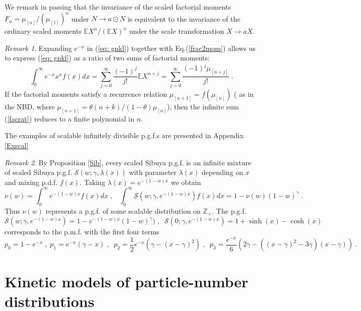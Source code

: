 \documentclass[a4paper,12pt]{amsart}
\newcommand{\E}{\mathbb{E}}
\newcommand{\Z}{\mathbb{Z}_{+}}
\theoremstyle{definition}
\theoremstyle{remark}
\newtheorem{Remark}{Remark}[section]
\begin{document}
We remark in passing that the invariance of the scaled factorial moments $F_n=\mu_{[n]}/(\mu_{[1]})^n$ under $N\to a\odot N$ is equivalent to the invariance of the ordinary scaled moments $\E X^n/(\E X)^n$ under the scale transformation $X\to aX$.        


\begin{Remark}
Expanding $e^{-x}$ in (\ref{eq: gnkl}) together with Eq.(\ref{frac2mom}) allows us to express  (\ref{eq: gnkl}) as a ratio of two sums of factorial moments:
\begin{equation}\label{facrat}
\int_{0}^{\infty}e^{-x}x^{n} f(x) dx=\sum_{j=0}^{\infty}\frac{(-1)^j}{j!}\E X^{n+j}=
\sum_{j=0}^{\infty}\frac{(-1)^j\mu_{[n+j]}}{j!}   
\;.
\end{equation}
If the factorial moments satisfy a recurrence relation $\mu_{[n+1]}=f(\mu_{[n]})$ ( as in the NBD, where $\mu_{[n+1]}=\theta(n+k)/(1-\theta)\mu_{[n]}$), then the infinite sum (\ref{facrat}) reduces to a finite polynomial in $n$. 
\end{Remark}

The examples of scalable infinitely divisible p.g.f.{}s are presented in Appendix \ref{Exscal}

\begin{Remark}

By Proposition \ref{Sib}, every scaled Sibuya p.g.f. is an infinite mixture of scaled Sibuya p.g.f. $\mathcal{S}(w;\gamma,\lambda(x))$ with parameter $\lambda(x)$ depending on $x$  and mixing p.d.f. $f(x)$.  Taking $\lambda(x)=e^{-(1-w) x}$ we obtain 
\[
 \nu(w)=\int_0^{\infty}e^{-(1-w) x}f(x)dx\;,\;\;\; \int_{0}^{\infty}\mathcal{S}(w;\gamma,e^{-(1-w) x}) f(x)dx =     1-\nu(w)(1-w)^{\gamma}\;.
 \] 
 Thus $\nu(w)$ represents a p.g.f. of some scalable distribution on $\Z$. The p.g.f.
 \[
 \mathcal{S}(w;\gamma,e^{-(1-w) x})=1-e^{-(1-w) x}(1-w)^{\gamma})\;,\;\;  \mathcal{S}(0;\gamma,e^{-(1-w) x})=1+\sinh (x)-\cosh (x)
 \]
 corresponds to the p.m.f. with the first four terms 
 \[
 p_0=1-e^{-x}\;,\; 
 p_1=e^{-x}(\gamma-x)\;,\;\;
 p_2=\frac{1}{2} e^{-x} (\gamma-(x-\gamma)^2)\;,\;\; p_3=
 \frac{e^{-x}}{6}(2\gamma-((x-\gamma )^2-3 \gamma) (x-\gamma ))\;.
 \]
     
\end{Remark}

\newpage
\section{Kinetic models of particle-number distributions} \label{kinmodels}
\end{document}
